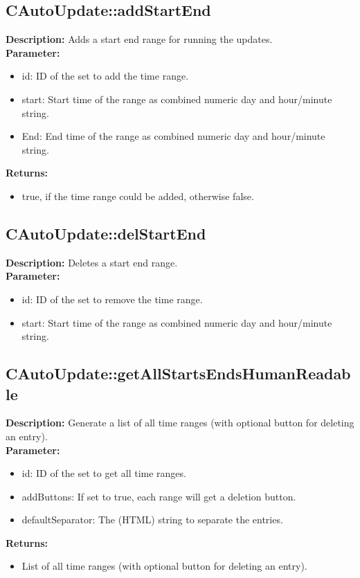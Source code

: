 \subsection{CAutoUpdate::addStartEnd}
\textbf{Description:} Adds a start end range for running the updates.\\
\textbf{Parameter:}
\begin{itemize}
\item id: ID of the set to add the time range.
\item start: Start time of the range as combined numeric day and hour/minute string.
\item End: End time of the range as combined numeric day and hour/minute string.
\end{itemize}
\textbf{Returns:}
\begin{itemize}
\item true, if the time range could be added, otherwise false.
\end{itemize}

\subsection{CAutoUpdate::delStartEnd}
\textbf{Description:} Deletes a start end range.\\
\textbf{Parameter:}
\begin{itemize}
\item id: ID of the set to remove the time range.
\item start: Start time of the range as combined numeric day and hour/minute string.
\end{itemize}

\subsection{CAutoUpdate::getAllStartsEndsHumanReadable}
\textbf{Description:} Generate a list of all time ranges (with optional button for deleting an entry).\\
\textbf{Parameter:}
\begin{itemize}
\item id: ID of the set to get all time ranges.
\item addButtons: If set to true, each range will get a deletion button.
\item defaultSeparator: The (HTML) string to separate the entries.
\end{itemize}
\textbf{Returns:}
\begin{itemize}
\item List of all time ranges (with optional button for deleting an entry).
\end{itemize}

